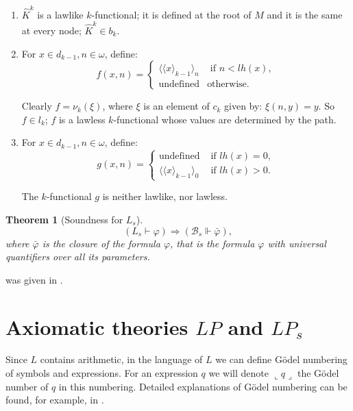 \documentclass{asl}
\newtheorem{theorem}{Theorem}[section]
\theoremstyle{definition}
\begin{document}
\begin{enumerate}
\item $\widehat{K}^{k}$ is a lawlike $ k $-functional; it is defined at the root of $ M $ and it is the same at every node; $ \widehat{K}^{k}\in b_{k}$.
\medskip

\item For $ x\in d_{k-1}, n\in \omega $, define:
\begin{displaymath}
f(x,n) =
\begin{cases}
\langle\langle x\rangle_{k-1}\rangle_n & \text{ if } n<lh(x),\\
\text{undefined}& \text{otherwise}.
\end{cases}
\end{displaymath} 

Clearly $f=\nu_k(\xi)  $, where $ \xi$ is an element of $ c_{k} $ given by: $\xi(n,y)=y$. So $ f\in l_{k} $; $ f $ is a lawless $ k $-functional whose values are determined by the path.
\medskip

\item For $ x\in d_{k-1}, n\in \omega $, define:
\begin{displaymath}
g(x,n) =
\begin{cases}
\text{undefined}& \text{ if } lh(x)=0,\\
\langle\langle x\rangle_{k-1}\rangle _0  & \text{ if } lh(x)>0.
\end{cases}
\end{displaymath} 

The $ k$-functional $ g $ is neither lawlike, nor lawless.
\end{enumerate}

\begin{theorem}[Soundness for $ L_s $]
\[ (L_s\vdash\varphi)\Rightarrow  (\mathcal{B}_s \Vdash\bar{\varphi}), \]
where $ \bar{\varphi} $ is the closure of the formula $ \varphi $, that is the formula $ \varphi $ with universal quantifiers over all its parameters.
\label{theorem:soundness_l} 
\end{theorem}

\begin{proofplain}
was given in \cite{kach13}.
\end{proofplain}


\section{Axiomatic theories $LP$ and $LP_s$}

Since $L$ contains arithmetic, in the language of $L$ we can define G\"{o}del numbering of symbols and expressions. For an expression $q$ we will denote $\llcorner q \lrcorner$ the G\"{o}del number of $q$ in this numbering. Detailed explanations of G\"{o}del numbering can be found, for example, in \cite{mend09}.
\end{document}
